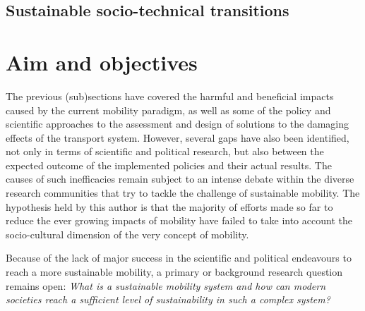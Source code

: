 \subsection{Sustainable socio-technical transitions}
\label{ss:intro:sustainable-transitions}



%
\section{Aim and objectives}
\label{s:intro:aim-objectives}

The previous (sub)sections have covered the harmful and beneficial impacts caused by the current mobility paradigm, as well as some of the policy and scientific approaches to the assessment and design of solutions to the damaging effects of the transport system. However, several gaps have also been identified, not only in terms of scientific and political research, but also between the expected outcome of the implemented policies and their actual results. The causes of such inefficacies remain subject to an intense debate within the diverse research communities that try to tackle the challenge of sustainable mobility. The hypothesis held by this author is that the majority of efforts made so far to reduce the ever growing impacts of mobility have failed to take into account the socio-cultural dimension of the very concept of mobility.

Because of the lack of major success in the scientific and political endeavours to reach a more sustainable mobility, a primary or background research question remains open: \textit{What is a sustainable mobility system and how can modern societies reach a sufficient level of sustainability in such a complex system?}

